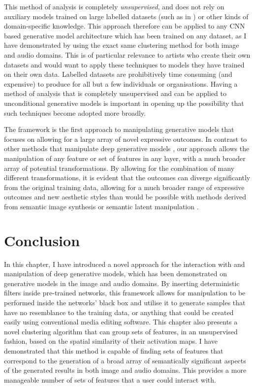 This method of analysis is completely \emph{unsupervised}, and does not rely on auxiliary models trained on large labelled datasets (such as in \citep{Bau2018-td, isola2017image, park2019semantic}) or other kinds of domain-specific knowledge. 
This approach therefore can be applied to any CNN based generative model architecture which has been trained on any dataset, as I have demonstrated by using the exact same clustering method for both image and audio domains. 
This is of particular relevance to artists who create their own datasets and would want to apply these techniques to models they have trained on their own data. 
Labelled datasets are prohibitively time consuming (and expensive) to produce for all but a few individuals or organisations. 
Having a method of analysis that is completely unsupervised and can be applied to unconditional generative models is important in opening up the possibility that such techniques become adopted more broadly.

The framework is the first approach to manipulating generative models that focuses on allowing for a large array of novel expressive outcomes. 
In contrast to other methods that manipulate deep generative models \citep{bau2019semantic, bau2020rewriting}, our approach allows the manipulation of any feature or set of features in any layer, with a much broader array of potential transformations. 
By allowing for the combination of many different transformations, it is evident that the outcomes can diverge significantly from the original training data, allowing for a much broader range of expressive outcomes and new aesthetic styles than would be possible with methods derived from semantic image synthesis \citep{isola2017image, chen2017photographic, park2019semantic} or semantic latent manipulation \citep{brock2016neural,  shen2020interpreting, harkonen2020ganspace}.

\section{Conclusion}

In this chapter, I have introduced a novel approach for the interaction with and manipulation of deep generative models, which has been demonstrated on generative models in the image and audio domains. 
By inserting deterministic filters inside pre-trained networks, this framework allows for manipulation to be performed inside the networks' black box and utilise it to generate samples that have no resemblance to the training data, or anything that could be created easily using conventional media editing software. 
This chapter also presents a novel clustering algorithm that can group sets of features, in an unsupervised fashion, based on the spatial similarity of their activation maps. 
I have demonstrated that this method is capable of finding sets of features that correspond to the generation of a broad array of semantically significant aspects of the generated results in both image and audio domains. 
This provides a more manageable number of sets of features that a user could interact with. 

